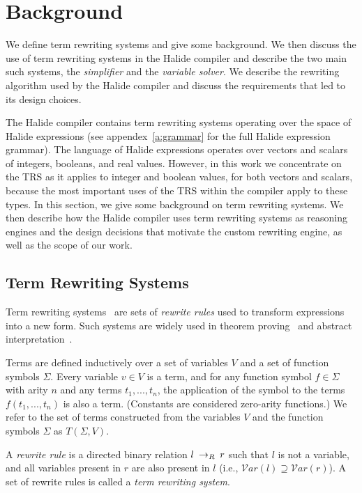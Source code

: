 \chapter{Background}
\label{chapter:overview}

We define term rewriting systems and give some background. We then discuss the use of term rewriting systems in the Halide compiler and describe the two main such systems, the \emph{simplifier} and the \emph{variable solver}. We describe the rewriting algorithm used by the Halide compiler and discuss the requirements that led to its design choices. 

The Halide compiler contains term rewriting systems operating over the space of Halide expressions (see appendex~\ref{a:grammar} for
the full Halide expression grammar). The language of Halide expressions
operates over vectors and scalars of integers, booleans, and real values.  However, in
this work we concentrate on the TRS as it applies to integer and boolean values, for
both vectors and scalars, because the most important uses of the TRS within the compiler
apply to these types.  In this section, we give some background on term rewriting systems.
We then describe how the Halide compiler uses term rewriting systems as reasoning engines
and the design decisions that motivate the custom rewriting engine, as well as the scope
of our work.

\section{Term Rewriting Systems}

Term rewriting systems~\cite{gorn1967} are sets of \textit{rewrite rules} used to transform expressions into a new form.  Such systems are widely
used in theorem proving~\cite{baader1999term} and abstract interpretation~\cite{cousot1977abstract, cousot1979systematic}.

Terms are defined inductively over a set of variables $V$ and a set of function symbols $\Sigma$. Every variable $v \in V$ is a term, and for any function symbol $f \in \Sigma$ with arity $n$ and any terms $t_1, ..., t_n$, the application of the symbol to the terms $f(t_1, ..., t_n)$ is also a term. (Constants are considered zero-arity functions.) We refer to the set of terms constructed from the variables $V$ and the function symbols $\Sigma$ as $T(\Sigma, V)$.

A \emph{rewrite rule} is a directed binary relation $l \:\rightarrow_{R}\: r$ such that $l$ is not a variable, and all variables present in $r$ are also present in $l$ (i.e., $\mathcal{V}ar(l) \supseteq \mathcal{V}ar(r)$). A set of rewrite rules is called a \emph{term rewriting system}.

